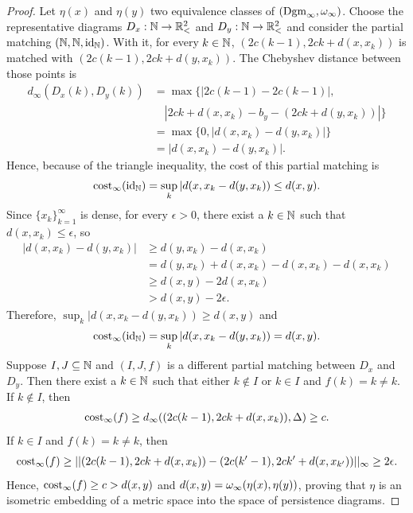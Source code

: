 \begin{proof}
    Let $ \eta(x) $ and $ \eta(y) $ two equivalence classes of $ (\operatorname{Dgm}_\infty, \omega_\infty) $. Choose the representative diagrams $D_x : \mathbb N \to \mathbb{R}_<^2 $ and $D_y : \mathbb N \to \mathbb{R}_<^2 $ and consider the partial matching $ (\mathbb N, \mathbb N, \operatorname{id}_\mathbb N) $. With it, for every $ k \in \mathbb N $, $ (2c(k-1), 2ck + d(x, x_k)) $ is matched with $ (2c(k-1), 2ck + d(y, x_k)) $. The Chebyshev distance between those points is
    \begin{align*}
        d_\infty(D_x(k), D_y(k)) 
        &= \max \big\{|2c(k-1) - 2c(k-1)|, \\
        &\quad |2ck + d(x, x_k) - b_y - (2ck + d(y, x_k))| \big\} \\
        &= \max \{0, |d(x, x_k) - d(y, x_k)|\} \\
        &= |d(x, x_k) - d(y, x_k)|.
    \end{align*}
    Hence, because of the triangle inequality, the cost of this partial matching is
    \begin{align*}
        \operatorname{cost}_\infty(\operatorname{id}_\mathbb N) = \sup_k |d(x, x_k - d(y, x_k)) \leq d(x, y).
    \end{align*}
    Since $ \{ x_k \}_{k=1}^\infty $ is dense, for every $ \epsilon > 0 $, there exist a $ k \in \mathbb N $ such that $ d(x, x_k) \leq \epsilon $, so
    \begin{align*}
        |d(x, x_k) - d(y, x_k)| 
        &\geq d(y, x_k) - d(x, x_k) \\
        &= d(y, x_k) + d(x, x_k) - d(x, x_k) - d(x, x_k) \\
        &\geq d(x, y) - 2d(x, x_k) \\
        &> d(x, y) - 2\epsilon.
    \end{align*}
    Therefore, $ \sup_k |d(x, x_k - d(y, x_k)) \geq d(x, y) $ and
    \begin{align*}
        \operatorname{cost}_\infty(\operatorname{id}_\mathbb N) = \sup_k |d(x, x_k - d(y, x_k)) = d(x, y).
    \end{align*}
    Suppose $ I, J \subseteq \mathbb N $ and $ (I, J, f) $ is a different partial matching between $ D_x $ and $ D_y $. Then there exist a $ k \in \mathbb N $ such that either $ k \notin I $ or $ k \in I $ and $ f(k) = k \neq k $. If $ k \notin I $, then
    \begin{align*}
        \operatorname{cost}_\infty(f) \geq d_\infty((2c(k-1), 2ck + d(x, x_k)), \Delta) \geq c.
    \end{align*}
    If $ k \in I$ and $ f(k) = k \neq k $, then
    \begin{align*}
        \operatorname{cost}_\infty(f) \geq || (2c(k-1), 2ck + d(x, x_k)) - (2c(k'-1), 2ck' + d(x, x_{k'}))||_\infty \geq 2 \epsilon.
    \end{align*}
    Hence, $ \operatorname{cost}_\infty(f) \geq c > d(x, y)$ and $d(x,y) = \omega_\infty(\eta(x), \eta(y)) $, proving that $ \eta $ is an isometric embedding of a metric space into the space of persistence diagrams.
\end{proof}

